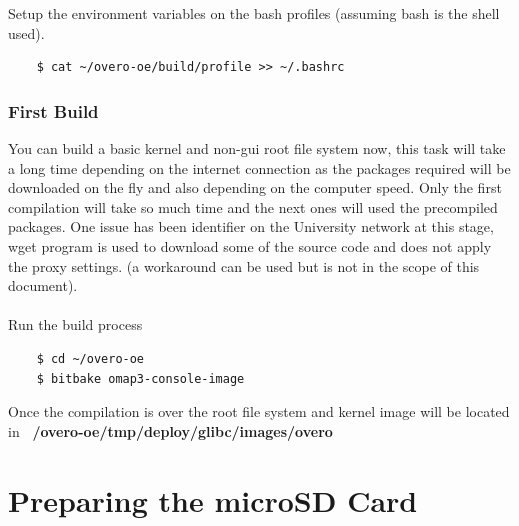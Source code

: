 \documentclass[11pt]{report} %
\begin{document}
		Setup the environment variables on the bash profiles (assuming bash is
		the shell used).
\begin{lstlisting}
	$ cat ~/overo-oe/build/profile >> ~/.bashrc
\end{lstlisting}

	\subsubsection{First Build}	
		You can build a basic kernel and non-gui root file system now, this
		task will take a long time depending on the internet connection as the
		packages required will be downloaded on the fly and also depending on
		the computer speed. Only the first compilation will take so much time
		and the next ones will used the precompiled packages.
		 One issue has been identifier on the University
		network at this stage, wget program is used to download some of the
		source code and does not apply the proxy settings. (a workaround can
		be used but is not in the scope of this document).\\
		\\
		Run the build process
\begin{lstlisting}
	$ cd ~/overo-oe
	$ bitbake omap3-console-image
\end{lstlisting}
		
		Once the compilation is over the root file system and kernel image
		will be located in {\bf ~/overo-oe/tmp/deploy/glibc/images/overo}
	
	\section{Preparing the microSD Card}
\end{document}
